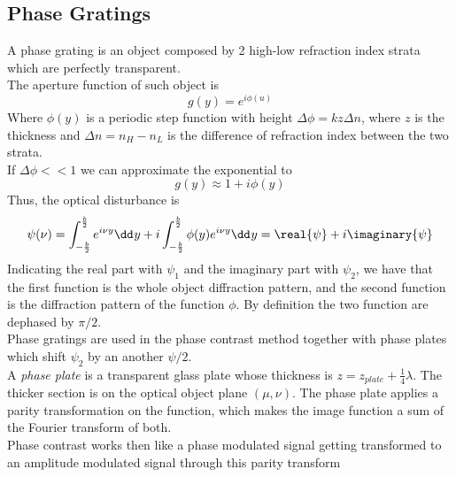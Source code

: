 \documentclass[../electromagnetism.tex]{subfiles}
\begin{document}
\subsection{Phase Gratings}
A phase grating is an object composed by 2 high-low refraction index strata which are perfectly transparent.\\
The aperture function of such object is
\begin{equation}
	g(y)=e^{i\phi(u)}
	\label{eq:phasegrating.fdiff}
\end{equation}
Where $\phi(y)$ is a periodic step function with height $\Delta\phi=kz\Delta n$, where $z$ is the thickness and $\Delta n=n_H-n_L$ is the difference of refraction index between the two strata.\\
If $\Delta\phi<<1$ we can approximate the exponential to
\begin{equation*}
	g(y)\approx1+i\phi(y)
\end{equation*}
Thus, the optical disturbance is
\begin{equation}
	\psi(\nu)=\int_{-\frac{b}{2}}^{\frac{b}{2}}e^{i\nu y}\dd^{}{y}+i\int_{-\frac{b}{2}}^{\frac{b}{2}}\phi(y)e^{i\nu y}\dd^{}{y}=\real{\psi}+i\imaginary{\psi}
	\label{eq:phasegrating.pattern}
\end{equation}
Indicating the real part with $\psi_1$ and the imaginary part with $\psi_2$, we have that the first function is the whole object diffraction pattern, and the second function is the diffraction pattern of the function $\phi$. By definition the two function are dephased by $\pi/2$.\\
Phase gratings are used in the phase contrast method together with phase plates which shift $\psi_2$ by an another $\psi/2$.\\
A \textit{phase plate} is a transparent glass plate whose thickness is $z=z_{plate}+\frac{1}{4}\lambda$. The thicker section is on the optical object plane $(\mu, \nu)$. The phase plate applies a parity transformation on the function, which makes the image function a sum of the Fourier transform of both.\\
Phase contrast works then like a phase modulated signal getting transformed to an amplitude modulated signal through this parity transform
\end{document}
